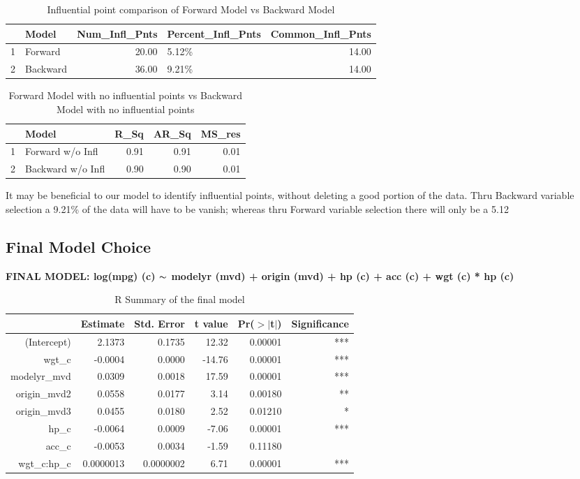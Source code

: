 \documentclass{article}
\newcommand{\mt}[1]{\ensuremath{#1}}
\newcommand{\tl}{\mt{\thicksim} }
\begin{document}
\begin{table}[ht]
\centering
\begin{tabular}{rlrlr}
  \hline
 & Model & Num\_Infl\_Pnts & Percent\_Infl\_Pnts & Common\_Infl\_Pnts \\ 
  \hline
1 & Forward & 20.00 & 5.12\% & 14.00 \\ 
  2 & Backward & 36.00 & 9.21\% & 14.00 \\ 
   \hline
\end{tabular}
\caption{Influential point comparison of Forward Model vs Backward Model}
\label{tab:myfirsttable}
\end{table}

\begin{table}[ht]
\centering
\begin{tabular}{rlrrr}
  \hline
 & Model & R\_Sq & AR\_Sq & MS\_res \\ 
  \hline
1 & Forward w/o Infl & 0.91 & 0.91 & 0.01 \\ 
  2 & Backward w/o Infl & 0.90 & 0.90 & 0.01 \\ 
   \hline
\end{tabular}
\caption{Forward Model with no influential points vs Backward Model with no influential points}
\label{tab:forwardvsbackwardnoinfluential}
\end{table}

It may be beneficial to our model to identify influential points, without deleting a good portion of the data.  Thru Backward variable selection a 9.21\% of the data will have to be vanish; whereas thru Forward variable selection there will only be a 5.12%

\clearpage
\newpage

\subsection{Final Model Choice}

\textbf{FINAL MODEL: log(mpg) (c) \tl modelyr (mvd) + origin (mvd) + hp (c) + acc (c) + wgt (c) * hp (c)}

\begin{table}[ht]
\centering
\begin{tabular}{rrrrrr}
  \hline
 & Estimate & Std. Error & t value & Pr($>$$|$t$|$) & Significance\\ 
  \hline
(Intercept) & 2.1373 & 0.1735 & 12.32 & 0.00001 & *** \\ 
  wgt\_c & -0.0004 & 0.0000 & -14.76 & 0.00001 & *** \\ 
  modelyr\_mvd & 0.0309 & 0.0018 & 17.59 & 0.00001 & *** \\ 
  origin\_mvd2 & 0.0558 & 0.0177 & 3.14 & 0.00180 & ** \\ 
  origin\_mvd3 & 0.0455 & 0.0180 & 2.52 & 0.01210 & * \\ 
  hp\_c & -0.0064 & 0.0009 & -7.06 & 0.00001 & *** \\ 
  acc\_c & -0.0053 & 0.0034 & -1.59 & 0.11180 & \\ 
  wgt\_c:hp\_c & 0.0000013 & 0.0000002 & 6.71 & 0.00001 & *** \\ 
   \hline
\end{tabular}
\caption{R Summary of the final model}
\label{tab:summaryfinalmodel}
\end{table}
\end{document}
